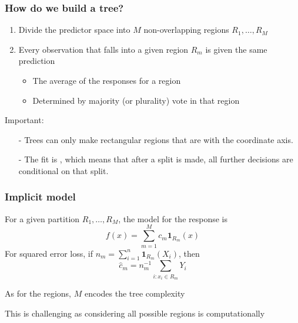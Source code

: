 \documentclass[12pt]{beamer}
\begin{document}
%


\begin{frame}[fragile]
\frametitle{How do we build a tree?}

\begin{enumerate}
\item Divide the predictor space into
$M$ non-overlapping regions $R_1, \ldots, R_M$ 

\item Every observation that falls into a given region $R_m$ is given the same prediction
\begin{itemize}
\item {} The average of the responses for a region
\item {} Determined by majority (or plurality) vote in that region
\end{itemize}
\end{enumerate}
\vsp

Important:
\begin{itemize}
\item[-] Trees can only make rectangular regions that are  with the coordinate axis.
\item[-] The fit is , which means that after a split is made, all further decisions are conditional
on that split.
\end{itemize}
\end{frame}


\begin{frame}[fragile]
\frametitle{Implicit model}
For a given partition $R_1, \ldots, R_M$, the model for the response is
\[
f(x) = \sum_{m = 1}^M c_m \mathbf{1}_{R_m}(x)
\]
For squared error loss, if $n_m = \sum_{i=1}^n \mathbf{1}_{R_m}(X_i)$, then 
\[
\hat{c}_m = n_m^{-1}\sum_{i:x_i \in R_m} Y_i
\]

\vsp
As for the regions, $M$ encodes the tree complexity

\vsp
This is challenging as considering all possible regions is computationally 

\end{frame}
\end{document}
